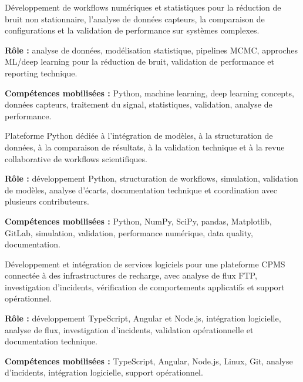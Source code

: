 \documentclass[8pt,a4paper,ragged2e,withhyper]{altacv}
\begin{document}
Développement de workflows numériques et statistiques pour la réduction de bruit non stationnaire, l’analyse de données capteurs, la comparaison de configurations et la validation de performance sur systèmes complexes.

\textbf{Rôle :} analyse de données, modélisation statistique, pipelines MCMC, approches ML/deep learning pour la réduction de bruit, validation de performance et reporting technique.

\textbf{Compétences mobilisées :} Python, machine learning, deep learning concepts, données capteurs, traitement du signal, statistiques, validation, analyse de performance.

\divider


Plateforme Python dédiée à l’intégration de modèles, à la structuration de données, à la comparaison de résultats, à la validation technique et à la revue collaborative de workflows scientifiques.

\textbf{Rôle :} développement Python, structuration de workflows, simulation, validation de modèles, analyse d’écarts, documentation technique et coordination avec plusieurs contributeurs.

\textbf{Compétences mobilisées :} Python, NumPy, SciPy, pandas, Matplotlib, GitLab, simulation, validation, performance numérique, data quality, documentation.

\divider


Développement et intégration de services logiciels pour une plateforme CPMS connectée à des infrastructures de recharge, avec analyse de flux FTP, investigation d’incidents, vérification de comportements applicatifs et support opérationnel.

\textbf{Rôle :} développement TypeScript, Angular et Node.js, intégration logicielle, analyse de flux, investigation d’incidents, validation opérationnelle et documentation technique.

\textbf{Compétences mobilisées :} TypeScript, Angular, Node.js, Linux, Git, analyse d’incidents, intégration logicielle, support opérationnel.


\vspace{-.3cm}
\end{document}
